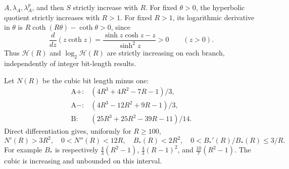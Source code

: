 \documentclass[11pt,letterpaper]{article}
\theoremstyle{definition}\newtheorem{definition}[theorem]{Definition}
\theoremstyle{remark}\newtheorem{remark}[theorem]{Remark}
\begin{document}
$A,\lambda_A,\lambda_A^p$, and then $S$ strictly increase with $R$.
For fixed $\theta>0$, the hyperbolic quotient strictly increases
with $R>1$. For fixed $R>1$, its logarithmic derivative in $\theta$
is $R\coth(R\theta)-\coth\theta>0$, since
\[
 \frac{d}{dz}(z\coth z)
 =\frac{\sinh z\cosh z-z}{\sinh^2z}>0\qquad(z>0).
\]
Thus $\mathcal H(R)$ and $\log_2\mathcal H(R)$ are strictly
increasing on each branch, independently of integer bit-length results.

Let $N(R)$ be the cubic bit length minus one:
\begin{equation}\label{fup:eh:eq:Ncubics}
\begin{array}{ll}
\mathrm A+:&(4R^3+4R^2-7R-1)/3,\\
\mathrm A-:&(4R^3-12R^2+9R-1)/3,\\
\mathrm B:&(25R^3+25R^2-39R-11)/14.
\end{array}
\end{equation}
Direct differentiation gives, uniformly for $R\ge100$,
\begin{equation}\label{fup:eh:eq:derivativebudget}
 N'(R)>3R^2,\quad 0<N''(R)<12R,\quad
 B_*(R)<2R^2,\quad 0<B_*'(R)/B_*(R)\le3/R.
\end{equation}
For example $B_*$ is respectively
$\frac43(R^2-1)$, $\frac43(R-1)^2$, and $\frac{10}{7}(R^2-1)$.
The cubic is increasing and unbounded on this interval.
\end{document}
